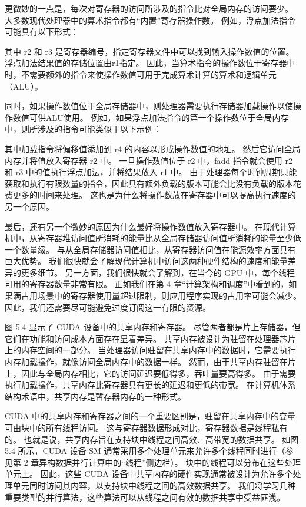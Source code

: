 更微妙的一点是，每次对寄存器的访问所涉及的指令比对全局内存的访问要少。 大多数现代处理器中的算术指令都有“内置”寄存器操作数。 例如，浮点加法指令可能具有以下形式：

其中 r2 和 r3 是寄存器编号，指定寄存器文件中可以找到输入操作数值的位置。 浮点加法结果值的存储位置由r1指定。 因此，当算术指令的操作数位于寄存器中时，不需要额外的指令来使操作数值可用于完成算术计算的算术和逻辑单元（ALU）。

同时，如果操作数值位于全局存储器中，则处理器需要执行存储器加载操作以使操作数值可供ALU使用。 例如，如果浮点加法指令的第一个操作数位于全局内存中，则所涉及的指令可能类似于以下示例：

其中加载指令将偏移值添加到 r4 的内容以形成操作数值的地址。 然后它访问全局内存并将值放入寄存器 r2 中。 一旦操作数值位于 r2 中，fadd 指令就会使用 r2 和 r3 中的值执行浮点加法，并将结果放入 r1 中。 由于处理器每个时钟周期只能获取和执行有限数量的指令，因此具有额外负载的版本可能会比没有负载的版本花费更多的时间来处理。 这也是为什么将操作数放在寄存器中可以提高执行速度的另一个原因。

最后，还有另一个微妙的原因为什么最好将操作数值放入寄存器中。 在现代计算机中，从寄存器堆访问值所消耗的能量比从全局存储器访问值所消耗的能量至少低一个数量级。 与从全局存储器访问值相比，从寄存器访问值在能源效率方面具有巨大优势。 我们很快就会了解现代计算机中访问这两种硬件结构的速度和能量差异的更多细节。 另一方面，我们很快就会了解到，在当今的 GPU 中，每个线程可用的寄存器数量非常有限。 正如我们在第 4 章“计算架构和调度”中看到的，如果满占用场景中的寄存器使用量超过限制，则应用程序实现的占用率可能会减少。 因此，我们还需要尽可能避免过度订阅这一有限的资源。

图 5.4 显示了 CUDA 设备中的共享内存和寄存器。 尽管两者都是片上存储器，但它们在功能和访问成本方面存在显着差异。 共享内存被设计为驻留在处理器芯片上的内存空间的一部分。 当处理器访问驻留在共享内存中的数据时，它需要执行内存加载操作，就像访问全局内存中的数据一样。 然而，由于共享内存驻留在片上，因此与全局内存相比，它的访问延迟要低得多，吞吐量要高得多。 由于需要执行加载操作，共享内存比寄存器具有更长的延迟和更低的带宽。 在计算机体系结构术语中，共享内存是暂存器内存的一种形式。

CUDA 中的共享内存和寄存器之间的一个重要区别是，驻留在共享内存中的变量可由块中的所有线程访问。 这与寄存器数据形成对比，寄存器数据是线程私有的。 也就是说，共享内存旨在支持块中线程之间高效、高带宽的数据共享。 如图 5.4 所示，CUDA 设备 SM 通常采用多个处理单元来允许多个线程同时进行（参见第 2 章异构数据并行计算中的“线程”侧边栏）。 块中的线程可以分布在这些处理单元上。 因此，这些 CUDA 设备中共享内存的硬件实现通常被设计为允许多个处理单元同时访问其内容，以支持块中线程之间的高效数据共享。 我们将学习几种重要类型的并行算法，这些算法可以从线程之间有效的数据共享中受益匪浅。

